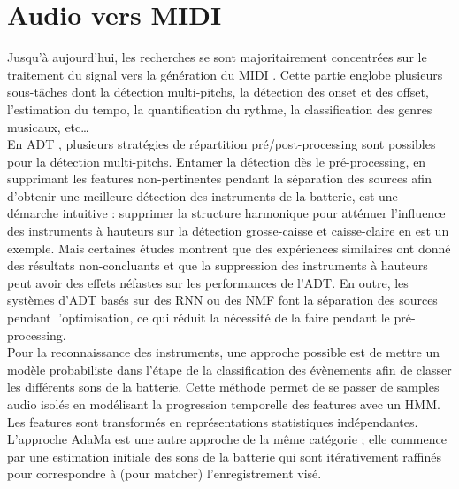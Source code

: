 \section{Audio vers MIDI}
Jusqu’à aujourd’hui, les recherches se sont majoritairement concentrées sur le traitement du signal vers la génération du MIDI \cite{AMT_for_2_Instru}. Cette partie englobe plusieurs sous-tâches dont la détection multi-pitchs, la détection des onset et des offset, l'estimation du tempo, la quantification du rythme, la classification des genres musicaux, etc…\\
En ADT \cite{Review_ADT}, plusieurs stratégies de répartition pré/post-processing sont possibles pour la détection multi-pitchs. Entamer la détection dès le pré-processing, en supprimant les features non-pertinentes pendant la séparation des sources afin d’obtenir une meilleure détection des instruments de la batterie, est une démarche intuitive : supprimer la structure harmonique pour atténuer l’influence des instruments à hauteurs sur la détection grosse-caisse et caisse-claire en est un exemple. Mais certaines études montrent que des expériences similaires ont donné des résultats non-concluants et que la suppression des instruments à hauteurs peut avoir des effets néfastes sur les performances de l’ADT. En outre, les systèmes d’ADT basés sur des RNN ou des NMF font la séparation des sources pendant l’optimisation, ce qui réduit la nécessité de la faire pendant le pré-processing.\\
Pour la reconnaissance des instruments, une approche possible \cite{Eronen} est de mettre un modèle probabiliste dans l’étape de la classification des évènements afin de classer les différents sons de la batterie. Cette méthode permet de se passer de samples audio isolés en modélisant la progression temporelle des features avec un HMM. Les features sont transformés en représentations statistiques indépendantes.
L’approche AdaMa \cite{adama_1} est une autre approche de la même catégorie ; elle commence par une estimation initiale des sons de la batterie qui sont itérativement raffinés pour correspondre à (pour matcher) l’enregistrement visé.\\
